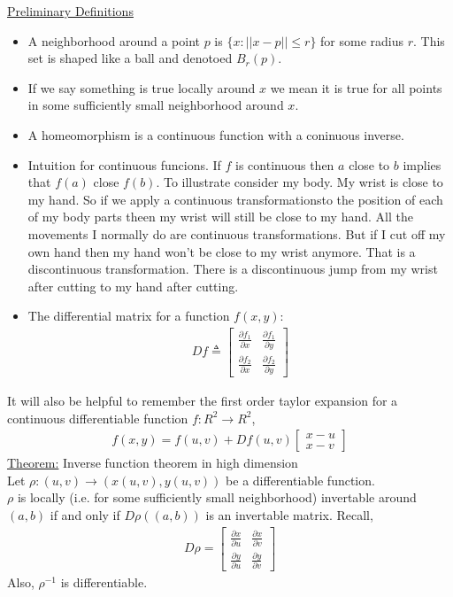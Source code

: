 \documentclass[12pt,letterpaper]{hmcpset}
\begin{document}
\underline{Preliminary Definitions}
\begin{itemize}
\item A neighborhood around a point $p$ is $\{ x: ||x - p|| \leq r\}$ for some
  radius $r$. This set is shaped like a ball and denotoed $B_r(p)$.
\item If we say something is true locally around $x$ we mean it is true for all
  points in some sufficiently small neighborhood around $x$.
\item A homeomorphism is a continuous function with a coninuous inverse.
\item Intuition for continuous funcions. If $f$ is continuous then $a$ close to
  $b$ implies that $f(a)$ close $f(b)$. To illustrate consider my body. My wrist
  is close to my hand. So if we apply a continuous transformationsto the position
  of each of my body parts theen my wrist will still be close to my hand. All
  the movements I normally do are continuous transformations.
  But if I cut off my own hand then my hand won't be close to my wrist anymore.
  That is a discontinuous transformation. There is a discontinuous jump from my
  wrist after cutting to my hand after cutting.
\item The differential matrix for a function $f(x, y)$:
  \begin{align*}
    Df \triangleq \begin{bmatrix}
    \frac{\partial f_1}{\partial x} & \frac{\partial f_1}{\partial y} \\
    \frac{\partial f_2}{\partial x} & \frac{\partial f_2}{\partial y}  
    \end{bmatrix}
  \end{align*}
\end{itemize}
It will also be helpful to remember the first order taylor expansion for a
continuous differentiable function $f: R^2 \rightarrow R^2$,
\begin{align*}
  f(x, y) = f(u, v) + Df(u, v)\begin{bmatrix}x - u \\ x - v\end{bmatrix}
\end{align*}
\underline{Theorem:} Inverse function theorem in high dimension \\
Let $\rho: (u, v) \rightarrow (x(u, v), y(u, v))$ be a differentiable function. \\
$\rho$ is locally (i.e. for some sufficiently small neighborhood) invertable around
$(a, b)$ if and only if $D\rho((a, b))$ is an
invertable matrix. Recall,
\begin{align*}
  D\rho =
  \begin{bmatrix}
    \frac{\partial x}{\partial u} & \frac{\partial x}{\partial v} \\
    \frac{\partial y}{\partial u} & \frac{\partial y}{\partial v}  
  \end{bmatrix}
\end{align*}
Also, $\rho^{-1}$ is differentiable.  
\begin{align*}

\end{align*}
\end{document}
